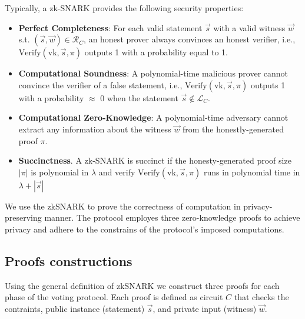 \documentclass[runningheads]{llncs}
\begin{document}
Typically, a zk-SNARK provides the following security properties:
\begin{itemize}
    \item \textbf{Perfect Completeness}: For each valid statement $\vec{s}$ with a valid witness $\vec{w}$ s.t. $(\vec{s}, \vec{w}) \in \mathcal{R}_C$, an honest prover always convinces an honest verifier, i.e., $\textrm{Verify}(\textrm{vk}, \vec{s}, \pi)$ outputs 1 with a probability equal to 1.
    \item \textbf{Computational Soundness}: A polynomial-time malicious prover cannot convince the verifier of a false statement, i.e., $\textrm{Verify}(\textrm{vk}, \vec{s}, \pi)$ outputs 1 with a probability $\approx$ 0 when the statement $\vec{s} \notin \mathcal{L}_C$.
    \item \textbf{Computational Zero-Knowledge}: A polynomial-time adversary cannot extract any information about the witness $\vec{w}$ from the honestly-generated proof $\pi$. 
    \item \textbf{Succinctness}. A zk-SNARK is succinct if the honesty-generated proof size $|\pi|$ is polynomial in $\lambda$ and verify $\textrm{Verify}(\textrm{vk}, \vec{s}, \pi)$ runs in polynomial time in $\lambda + |\vec{s}|$
\end{itemize}

We use the zkSNARK to prove the correctness of computation in privacy-preserving manner.
The protocol employes three zero-knowledge proofs to achieve privacy and adhere to the constrains of the protocol's imposed computations.



\subsection{Proofs constructions}\label{sec:proofs}

Using the general definition of zkSNARK we construct three proofs for each phase of the voting protocol. Each proof is defined as circuit $C$ that checks the contraints, public instance (statement) $\vec{s}$, and private input (witness) $\vec{w}$.

\subsubsection{}\label{sec:proof-fdkg}
\end{document}
